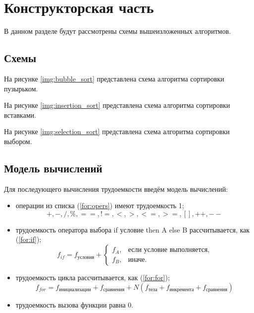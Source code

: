 \chapter{Конструкторская часть}

В данном разделе будут рассмотрены схемы вышеизложенных алгоритмов.

\section{Схемы}

На рисунке \ref{img:bubble_sort} представлена схема алгоритма сортировки пузырьком.


\clearpage

На рисунке \ref{img:insertion_sort} представлена схема алгоритма сортировки вставками.


\clearpage

На рисунке \ref{img:selection_sort} представлена схема алгоритма сортировки выбором.


\clearpage

\section{Модель вычислений}

Для последующего вычисления трудоемкости введём модель вычислений:

\begin{itemize}
	\item операции из списка (\ref{for:opers}) имеют трудоемкость 1;
	\begin{equation}
	\label{for:opers}
	+, -, /, \%, ==, !=, <, >, <=, >=, [], ++, {-}-
	\end{equation}
	\item трудоемкость оператора выбора if условие then A else B рассчитывается, как (\ref{for:if});
	\begin{equation}
	\label{for:if}
	f_{if} = f_{\text{условия}} +
	\begin{cases}
	f_A, & \text{если условие выполняется,}\\
	f_B, & \text{иначе.}
	\end{cases}
	\end{equation}
	\item трудоемкость цикла рассчитывается, как (\ref{for:for});
	\begin{equation}
	\label{for:for}
	f_{for} = f_{\text{инициализации}} + f_{\text{сравнения}} + N(f_{\text{тела}} + f_{\text{инкремента}} + f_{\text{сравнения}})
	\end{equation}
	\item трудоемкость вызова функции равна 0.
\end{itemize}

